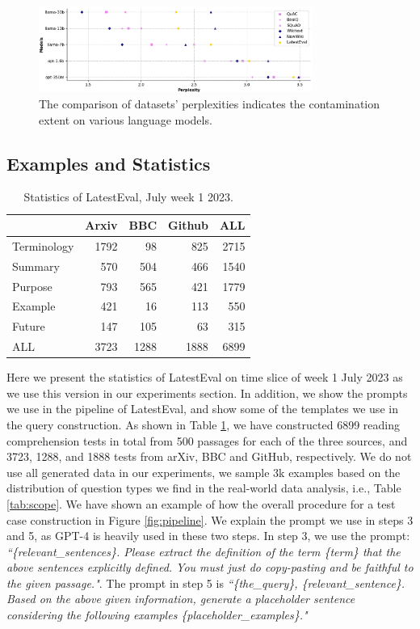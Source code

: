 \documentclass[letterpaper]{article} %
\begin{document}
\begin{figure}[t]
    \centering
    \includegraphics[width=0.8\textwidth]{contamination.png}
    \caption{The comparison of datasets' perplexities indicates the contamination extent on various language models.}
    \label{fig:contamination}
\end{figure}

\subsection{Examples and Statistics}

\begin{table}
    \centering
    \begin{tabular}{lrrr|r}
    \toprule
         & Arxiv & BBC & Github & ALL  \\
    \midrule
    Terminology & 1792 &  98 &  825 & 2715 \\
    Summary     &  570 & 504 &  466 & 1540 \\
    Purpose     &  793 & 565 &  421 & 1779 \\
    Example     &  421 &  16 &  113 & 550  \\
    Future      &  147 & 105 &   63 & 315  \\
    \midrule
    ALL         & 3723 & 1288 & 1888 & 6899 \\
    \bottomrule    
    \end{tabular}
    \caption{Statistics of LatestEval, July week 1 2023.}
    \label{tab:statistics}
\end{table}

Here we present the statistics of LatestEval on time slice of week 1 July 2023 as we use this version in our experiments section. In addition, we show the prompts we use in the pipeline of LatestEval, and show some of the templates we use in the query construction. As shown in Table \ref{tab:statistics}, we have constructed 6899 reading comprehension tests in total from 500 passages for each of the three sources, and 3723, 1288, and 1888 tests from arXiv, BBC and GitHub, respectively. We do not use all generated data in our experiments, we sample 3k examples based on the distribution of question types we find in the real-world data analysis, i.e., Table \ref{tab:scope}. We have shown an example of how the overall procedure for a test case construction in Figure \ref{fig:pipeline}. We explain the prompt we use in steps 3 and 5, as GPT-4 is heavily used in these two steps. In step 3, we use the prompt: \textit{``\{relevant\_sentences\}. Please extract the definition of the term \{term\} that the above sentences explicitly defined. You must just do copy-pasting and be faithful to the given passage."}. The prompt in step 5 is \textit{``\{the\_query\}, \{relevant\_sentence\}. Based on the above given information, generate a placeholder sentence considering the following examples \{placeholder\_examples\}."}
\end{document}
